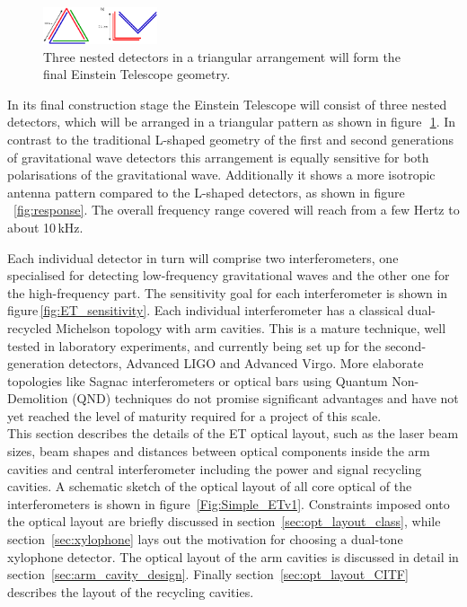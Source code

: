 
\FloatBarrier
\label{sec:optlayout}


\begin{figure}
	\centering
		\includegraphics[width=0.3\textwidth]{Intro/Intro_Figures/NestedDetectors.pdf}
	\caption{Three nested detectors in a triangular arrangement will 
	form the final Einstein Telescope geometry.}
	\label{fig:NestedDetectors}
\end{figure}
In its final construction stage the Einstein Telescope will consist of three nested detectors, which will be arranged in a triangular pattern as shown in figure\,~\ref{fig:NestedDetectors}. In contrast to the traditional L-shaped geometry of the first and second generations of gravitational wave detectors this arrangement is equally sensitive for both polarisations of the gravitational wave. Additionally it shows a more isotropic antenna pattern compared to the L-shaped detectors, as shown in figure\,~\ref{fig:response}. The overall frequency range covered will reach from a few Hertz to about 10\,kHz.

Each individual detector in turn will comprise two interferometers, one specialised for detecting low-frequency gravitational waves and the other one for the high-frequency part. The sensitivity goal for each interferometer is shown in figure\,\ref{fig:ET_sensitivity}. %
Each individual interferometer has a classical dual-recycled Michelson topology with arm cavities. This is a mature technique, well tested in laboratory experiments, and currently being set up for the second-generation detectors, Advanced LIGO and Advanced Virgo. More elaborate topologies like Sagnac interferometers or optical bars using Quantum Non-Demolition (QND) techniques do not promise significant advantages and have not yet reached the level of  maturity required for a project of this scale.\\



This section describes the details of the ET optical layout, such as the laser beam sizes, beam shapes and distances between optical components inside the arm cavities and central interferometer including the power and signal recycling cavities. A schematic sketch of the optical layout of all core optical of the interferometers is shown in figure~\ref{Fig:Simple_ETv1}.
Constraints imposed onto the optical layout are briefly discussed in section~\ref{sec:opt_layout_class}, while  section~\ref{sec:xylophone} lays out the motivation for choosing a dual-tone xylophone detector. The optical layout of the arm cavities is discussed in detail in section~\ref{sec:arm_cavity_design}. Finally section~\ref{sec:opt_layout_CITF} describes the layout of the recycling cavities. 

